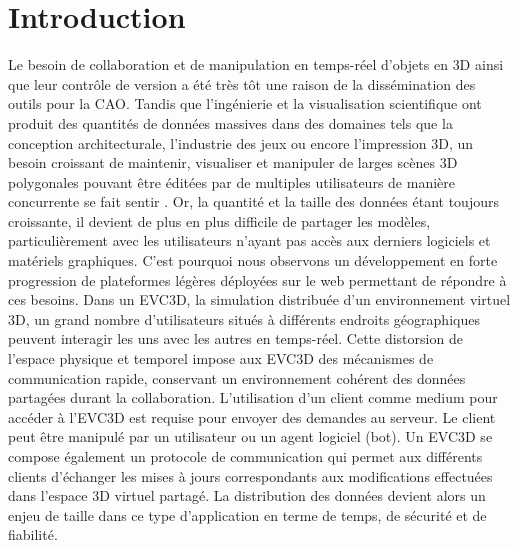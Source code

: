 \chapter{Introduction}
\chaptertable
Le besoin de collaboration et de manipulation en temps-réel d'objets en \gls{3D} 
ainsi que leur contrôle de version a été très tôt une raison de la dissémination des 
outils pour la \gls{CAO}. Tandis que l'ingénierie et la visualisation scientifique ont 
produit des quantités de données massives dans des domaines tels que la 
conception architecturale, l'industrie des jeux ou encore l'impression \gls{3D}, un 
besoin croissant de maintenir, visualiser et manipuler de larges scènes \gls{3D} 
polygonales pouvant être éditées par de multiples utilisateurs de manière 
concurrente se fait sentir \cite{Chandrasegaran2013,Wu2014}. Or, la quantité et la taille des données 
étant toujours croissante, il devient de plus en plus difficile de partager les 
modèles, particulièrement avec les utilisateurs n'ayant pas accès aux derniers 
logiciels et matériels graphiques. C'est pourquoi nous observons un 
développement en forte progression de plateformes légères déployées sur le web 
permettant de répondre à ces besoins. 
Dans un \gls{EVC3D}, la simulation distribuée d'un environnement virtuel 3D, un 
grand nombre d'utilisateurs situés à différents endroits géographiques peuvent 
interagir les uns avec les autres en temps-réel. 
Cette distorsion de l'espace physique et temporel impose aux \gls{EVC3D} des 
mécanismes de communication rapide, conservant un environnement cohérent
des données partagées durant la collaboration. 
L'utilisation d'un client comme medium pour 
accéder à l'\gls{EVC3D} est requise pour envoyer des demandes au serveur. Le 
client peut être manipulé par un utilisateur ou un agent logiciel (bot).
Un \gls{EVC3D} se compose également un protocole de communication qui 
permet aux différents clients d'échanger les mises à jours correspondants aux 
modifications effectuées dans l'espace 3D virtuel partagé. La distribution des 
données devient alors un enjeu de taille dans ce type d'application en terme de 
temps, de sécurité et de fiabilité. 

